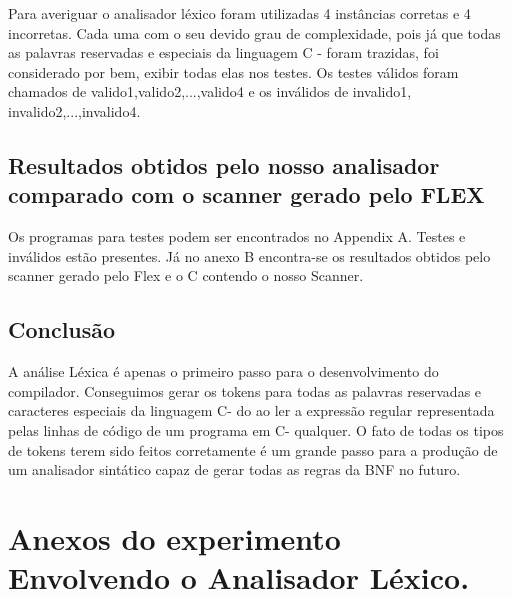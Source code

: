 \documentclass[12pt]{article}
\begin{document}
Para averiguar o analisador léxico foram utilizadas 4 instâncias corretas e 4 incorretas. Cada uma com o seu devido grau de complexidade, pois já que todas as palavras reservadas e especiais da linguagem C - foram trazidas, foi considerado por bem, exibir todas elas nos testes. Os testes válidos foram chamados de valido1,valido2,...,valido4 e os inválidos de invalido1, invalido2,...,invalido4. 

\subsection{Resultados obtidos pelo nosso analisador comparado com o scanner gerado pelo FLEX}

Os programas para testes podem ser encontrados no Appendix A. Testes e inválidos estão presentes. Já no anexo B encontra-se os resultados obtidos pelo scanner gerado pelo Flex e o C contendo o nosso Scanner.

\subsection{Conclusão}

A análise Léxica é apenas o primeiro passo para o desenvolvimento do compilador. 
Conseguimos gerar os tokens para todas as palavras reservadas e caracteres especiais da linguagem C- do \cite{LOUDEN} ao ler a expressão 
regular representada pelas linhas de código de um programa em C- qualquer. O fato de todas os tipos de tokens terem sido feitos corretamente
é um grande passo para a produção de um analisador sintático capaz de gerar todas as regras da BNF no futuro.




\newpage

\section{Anexos do experimento Envolvendo o Analisador Léxico.}
\end{document}
